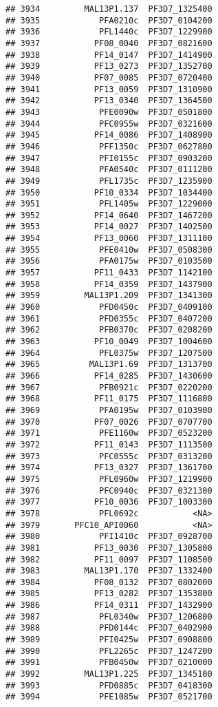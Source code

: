 \documentclass[12pt, a4paper]{article}\usepackage[]{graphicx}\usepackage[]{color}
\makeatletter
\newenvironment{kframe}{%
 \def\at@end@of@kframe{}%
 \ifinner\ifhmode%
  \def\at@end@of@kframe{\end{minipage}}%
  \begin{minipage}{\columnwidth}%
 \fi\fi%
 \def\FrameCommand##1{\hskip\@totalleftmargin \hskip-\fboxsep
 \colorbox{shadecolor}{##1}\hskip-\fboxsep
     \hskip-\linewidth \hskip-\@totalleftmargin \hskip\columnwidth}%
 \MakeFramed {\advance\hsize-\width
   \@totalleftmargin\z@ \linewidth\hsize
   \@setminipage}}%
 {\par\unskip\endMakeFramed%
 \at@end@of@kframe}
\newenvironment{knitrout}{}{} %
\makeatother
\begin{document}
\begin{knitrout}
\begin{kframe}
\begin{verbatim}
## 3934         MAL13P1.137  PF3D7_1325400
## 3935            PFA0210c  PF3D7_0104200
## 3936            PFL1440c  PF3D7_1229900
## 3937           PF08_0040  PF3D7_0821600
## 3938           PF14_0147  PF3D7_1414900
## 3939           PF13_0273  PF3D7_1352700
## 3940           PF07_0085  PF3D7_0720400
## 3941           PF13_0059  PF3D7_1310900
## 3942           PF13_0340  PF3D7_1364500
## 3943            PFE0090w  PF3D7_0501800
## 3944            PFC0955w  PF3D7_0321600
## 3945           PF14_0086  PF3D7_1408900
## 3946            PFF1350c  PF3D7_0627800
## 3947            PFI0155c  PF3D7_0903200
## 3948            PFA0540c  PF3D7_0111200
## 3949            PFL1735c  PF3D7_1235900
## 3950           PF10_0334  PF3D7_1034400
## 3951            PFL1405w  PF3D7_1229000
## 3952           PF14_0640  PF3D7_1467200
## 3953           PF14_0027  PF3D7_1402500
## 3954           PF13_0060  PF3D7_1311100
## 3955            PFE0410w  PF3D7_0508300
## 3956            PFA0175w  PF3D7_0103500
## 3957           PF11_0433  PF3D7_1142100
## 3958           PF14_0359  PF3D7_1437900
## 3959         MAL13P1.209  PF3D7_1341300
## 3960            PFD0450c  PF3D7_0409100
## 3961            PFD0355c  PF3D7_0407200
## 3962            PFB0370c  PF3D7_0208200
## 3963           PF10_0049  PF3D7_1004600
## 3964            PFL0375w  PF3D7_1207500
## 3965          MAL13P1.69  PF3D7_1313700
## 3966           PF14_0285  PF3D7_1430600
## 3967            PFB0921c  PF3D7_0220200
## 3968           PF11_0175  PF3D7_1116800
## 3969            PFA0195w  PF3D7_0103900
## 3970           PF07_0026  PF3D7_0707700
## 3971            PFE1160w  PF3D7_0523200
## 3972           PF11_0143  PF3D7_1113500
## 3973            PFC0555c  PF3D7_0313200
## 3974           PF13_0327  PF3D7_1361700
## 3975            PFL0960w  PF3D7_1219900
## 3976            PFC0940c  PF3D7_0321300
## 3977           PF10_0036  PF3D7_1003300
## 3978            PFL0692c           <NA>
## 3979       PFC10_API0060           <NA>
## 3980            PFI1410c  PF3D7_0928700
## 3981           PF13_0030  PF3D7_1305800
## 3982           PF11_0097  PF3D7_1108500
## 3983         MAL13P1.170  PF3D7_1332400
## 3984           PF08_0132  PF3D7_0802000
## 3985           PF13_0282  PF3D7_1353800
## 3986           PF14_0311  PF3D7_1432900
## 3987            PFL0340w  PF3D7_1206800
## 3988            PFD0144c  PF3D7_0402900
## 3989            PFI0425w  PF3D7_0908800
## 3990            PFL2265c  PF3D7_1247200
## 3991            PFB0450w  PF3D7_0210000
## 3992         MAL13P1.225  PF3D7_1345100
## 3993            PFD0885c  PF3D7_0418300
## 3994            PFE1085w  PF3D7_0521700

\end{verbatim}
\end{kframe}
\end{knitrout}
\end{document}

